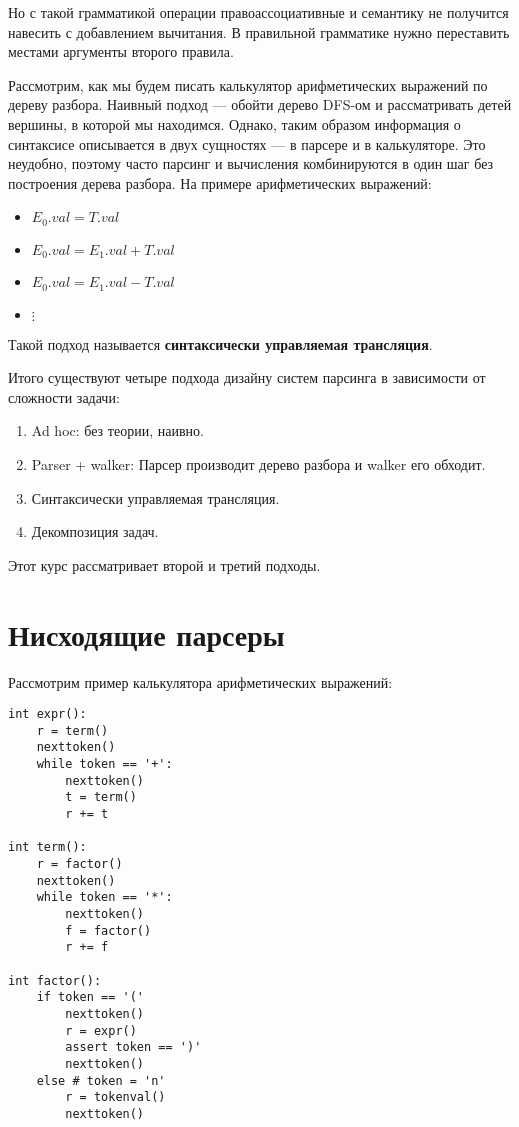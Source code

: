 Но с такой грамматикой операции правоассоциативные и семантику не получится навесить с добавлением вычитания. В правильной грамматике нужно переставить местами аргументы второго правила.

Рассмотрим, как мы будем писать калькулятор арифметических выражений по дереву разбора. Наивный подход --- обойти дерево DFS-ом и рассматривать детей вершины, в которой мы находимся. Однако, таким образом информация о синтаксисе описывается в двух сущностях --- в парсере и в калькуляторе. Это неудобно, поэтому часто парсинг и вычисления комбинируются в один шаг без построения дерева разбора. На примере арифметических выражений:
\begin{itemize}
    \item \(E_0.val = T.val\)
    \item \(E_0.val = E_1.val + T.val\)
    \item \(E_0.val = E_1.val - T.val\)
    \item \(\vdots\)
\end{itemize}

Такой подход называется \textbf{синтаксически управляемая трансляция}.

Итого существуют четыре подхода дизайну систем парсинга в зависимости от сложности задачи:
\begin{enumerate}
    \item Ad hoc: без теории, наивно.
    \item Parser + walker: Парсер производит дерево разбора и walker его обходит.
    \item Синтаксически управляемая трансляция.
    \item Декомпозиция задач.
\end{enumerate}

Этот курс рассматривает второй и третий подходы.

\section{Нисходящие парсеры}

Рассмотрим пример калькулятора арифметических выражений:
\begin{verbatim}
int expr():
    r = term()
    nexttoken()
    while token == '+':
        nexttoken()
        t = term()
        r += t

int term():
    r = factor()
    nexttoken()
    while token == '*':
        nexttoken()
        f = factor()
        r += f

int factor():
    if token == '('
        nexttoken()
        r = expr()
        assert token == ')'
        nexttoken()
    else # token = 'n'
        r = tokenval()
        nexttoken()
\end{verbatim}

